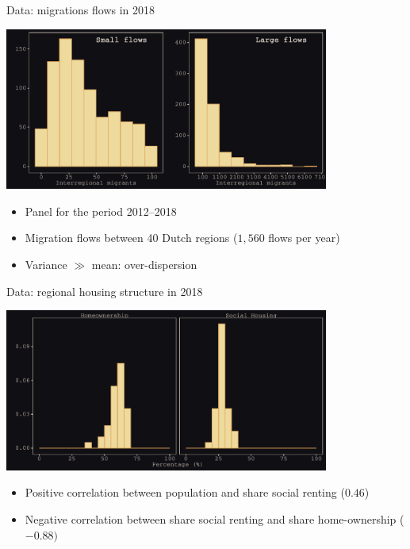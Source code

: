 \documentclass{beamer}
\begin{document}
\begin{frame}{Data: migrations flows in 2018}
	\begin{center}
		\includegraphics[width=0.8\textwidth]{../../fig/hist_mig_corop}      
	\end{center}
\begin{itemize}
	\item Panel for the period 2012--2018
	\item Migration flows \alert{between} 40 Dutch regions ($1,560$ flows per year)
	\item Variance $\gg$ mean: \alert{over-dispersion}
\end{itemize}
\end{frame}

\begin{frame}{Data: regional housing structure in 2018}
\begin{center}
	\includegraphics[width=0.8\textwidth]{../../fig/hist_housing_corop}
\end{center}
\begin{itemize}
	\item Positive correlation between population and share social renting ($0.46$)
	\item Negative correlation between share social renting and share home-ownership ($-0.88)$
\end{itemize}
\end{frame}
\end{document}
